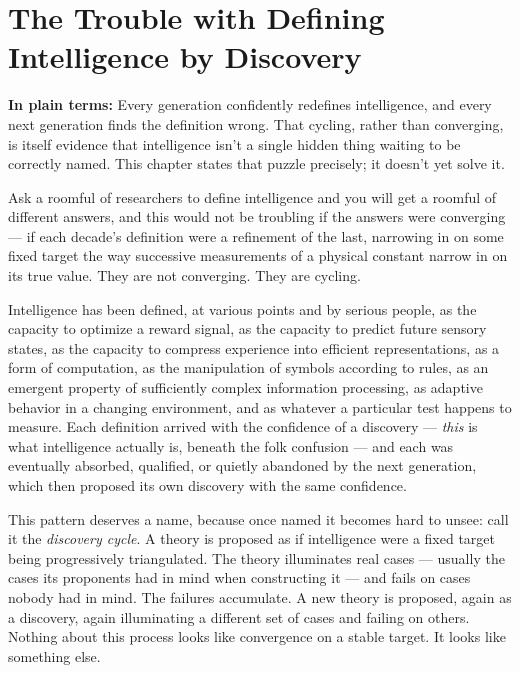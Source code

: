 \chapter{The Trouble with Defining Intelligence by Discovery}
\label{ch:discovery-trouble}

\begin{plainlanguage}
\textbf{In plain terms:} Every generation confidently redefines intelligence, and every next generation finds the definition wrong. That cycling, rather than converging, is itself evidence that intelligence isn't a single hidden thing waiting to be correctly named. This chapter states that puzzle precisely; it doesn't yet solve it.
\end{plainlanguage}

Ask a roomful of researchers to define intelligence and you will get a roomful of different answers, and this would not be troubling if the answers were converging --- if each decade's definition were a refinement of the last, narrowing in on some fixed target the way successive measurements of a physical constant narrow in on its true value. They are not converging. They are cycling.

Intelligence has been defined, at various points and by serious people, as the capacity to optimize a reward signal, as the capacity to predict future sensory states, as the capacity to compress experience into efficient representations, as a form of computation, as the manipulation of symbols according to rules, as an emergent property of sufficiently complex information processing, as adaptive behavior in a changing environment, and as whatever a particular test happens to measure. Each definition arrived with the confidence of a discovery --- \emph{this} is what intelligence actually is, beneath the folk confusion --- and each was eventually absorbed, qualified, or quietly abandoned by the next generation, which then proposed its own discovery with the same confidence.

This pattern deserves a name, because once named it becomes hard to unsee: call it the \emph{discovery cycle}. A theory is proposed as if intelligence were a fixed target being progressively triangulated. The theory illuminates real cases --- usually the cases its proponents had in mind when constructing it --- and fails on cases nobody had in mind. The failures accumulate. A new theory is proposed, again as a discovery, again illuminating a different set of cases and failing on others. Nothing about this process looks like convergence on a stable target. It looks like something else.

